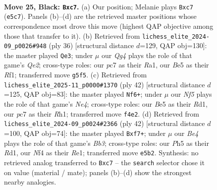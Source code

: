 \documentclass[11pt]{article}
\begin{document}
\clearpage

\begin{figure}[p]\centering
\begin{subfigure}{0.46\textwidth}\centering
\resizebox{\linewidth}{!}{%
\newchessgame
\chessboard[
  setfen={1r1r4/ppP2pk1/8/4b1qp/b3Pn2/5QPp/PP3P2/RBB1R1K1 b - - 0 25},
  showmover=false,
  pgfstyle=straightmove, color=movearrow, markmove={e5-c7}
]}
\caption{}
\end{subfigure}\hfill
\begin{subfigure}{0.46\textwidth}\centering
\resizebox{\linewidth}{!}{%
\newchessgame
\chessboard[
  setfen={r7/1pq1n1kp/p5p1/2Pp4/NP2prb1/3B1N2/P1P1Q1P1/R4RK1 w - - 0 19},
  showmover=false,
  pgfstyle=straightmove, color=movearrow, markmove={e2-e3}
]}
\caption{}
\end{subfigure}
\\[4pt]
\begin{subfigure}{0.46\textwidth}\centering
\resizebox{\linewidth}{!}{%
\newchessgame
\chessboard[
  setfen={2r1k2r/1p2bp2/p6p/3bqp2/3pN3/P4QP1/1P4BP/1K1R3R w k - 0 22},
  showmover=false,
  pgfstyle=straightmove, color=movearrow, markmove={e4-f6}
]}
\caption{}
\end{subfigure}\hfill
\begin{subfigure}{0.46\textwidth}\centering
\resizebox{\linewidth}{!}{%
\newchessgame
\chessboard[
  setfen={r3r1k1/5ppp/pq1p4/4Nb2/Pp3B2/1Bb2Q2/5PPP/3RR1K1 w - - 0 22},
  showmover=false,
  pgfstyle=straightmove, color=movearrow, markmove={b3-f7}
]}
\caption{}
\end{subfigure}
\caption{\textbf{Move 25, Black: \texttt{Bxc7}.} (a) Our position; Melanie plays \texttt{Bxc7} (\texttt{e5c7}). Panels (b)--(d) are the retrieved master positions whose correspondence most drove this move (highest QAP objective among those that transfer to it). (b) Retrieved from \texttt{lichess\_elite\_2024-09\_p0026\#948} (ply 36) [structural distance $d$=129, QAP obj=130]: the master played \texttt{Qe3}; under $\mu$ our \emph{Qg4} plays the role of that game's \emph{Qe2}; cross-type roles: our \emph{p}c7 as their \emph{R}a1, our \emph{B}e5 as their \emph{R}f1; transferred move \texttt{g5f5}. (c) Retrieved from \texttt{lichess\_elite\_2025-11\_p0000\#1370} (ply 42) [structural distance $d$=125, QAP obj=83]: the master played \texttt{Nf6+}; under $\mu$ our \emph{Nf5} plays the role of that game's \emph{Ne4}; cross-type roles: our \emph{B}e5 as their \emph{R}d1, our \emph{p}c7 as their \emph{R}h1; transferred move \texttt{f4e2}. (d) Retrieved from \texttt{lichess\_elite\_2024-09\_p0024\#2366} (ply 42) [structural distance $d$=100, QAP obj=74]: the master played \texttt{Bxf7+}; under $\mu$ our \emph{Be4} plays the role of that game's \emph{Bb3}; cross-type roles: our \emph{P}h5 as their \emph{R}d1, our \emph{N}f4 as their \emph{R}e1; transferred move \texttt{e5b2}. Synthesis: no retrieved analog transferred to \texttt{Bxc7} -- the \texttt{search} selector chose it on value (material / mate); panels (b)--(d) show the strongest nearby analogies.}
\label{fig:thought-m49}
\end{figure}
\end{document}
